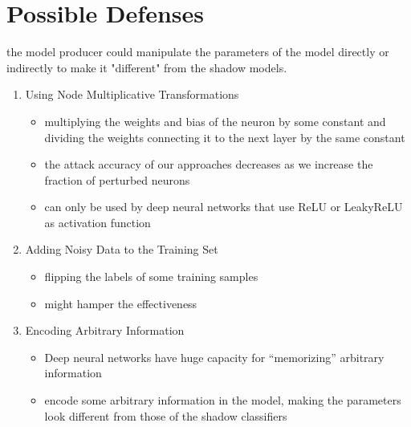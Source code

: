 \documentclass[11pt]{article}
\numberwithin{equation}{section}
\begin{document}
\section{Possible Defenses}

the model producer could manipulate the parameters of the model directly or indirectly to make it "different" from the shadow models.

\begin{enumerate}
    \item Using Node Multiplicative Transformations
    \begin{itemize}
        \item multiplying the weights and bias of the neuron by some constant and dividing the weights connecting it to the next layer by the same constant
        \item the attack accuracy of our approaches decreases as we increase the fraction of perturbed neurons
        \item can only be used by deep neural networks that use ReLU or LeakyReLU as activation function
    \end{itemize}
    \item Adding Noisy Data to the Training Set
    \begin{itemize}
        \item flipping the labels of some training samples
        \item might hamper the effectiveness
    \end{itemize}
    \item Encoding Arbitrary Information
    \begin{itemize}
        \item Deep neural networks have huge capacity for “memorizing” arbitrary information
        \item encode some arbitrary information in the model, making the parameters look different from those of the shadow classifiers
    \end{itemize}
\end{enumerate}



% 

\end{document}
